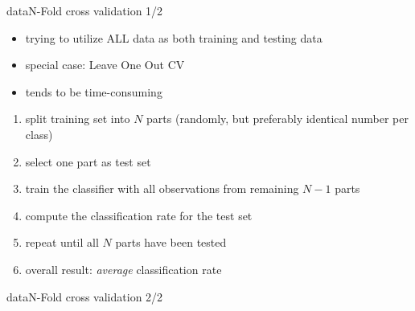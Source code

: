         \begin{frame}{data}{N-Fold cross validation 1/2}

            \begin{itemize}
                \item   trying to utilize ALL data as both training and testing data
                \item   special case: Leave One Out CV
                \item   tends to be time-consuming
            \end{itemize}
            \bigskip
            \begin{enumerate}
                \item<2->	split training set into $N$ parts (randomly, but preferably identical number per class)
                \item<3->	select one part as test set
                \item<4->	train the classifier with all observations from remaining $N-1$ parts
                \item<5->	compute the classification rate for the test set
                \item<6->	repeat until all $N$ parts have been tested
                \item<7->	overall result: \textit{average} classification rate
            \end{enumerate}
        \end{frame}
        
        \begin{frame}{data}{N-Fold cross validation 2/2}
            \begin{figure}
                
            \end{figure}

        \end{frame}
        
